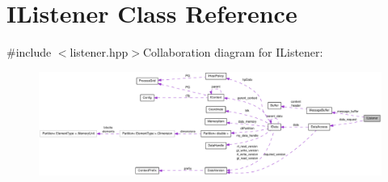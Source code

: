 \hypertarget{class_i_listener}{
\section{IListener Class Reference}
\label{class_i_listener}
}


{\ttfamily \#include $<$listener.hpp$>$}Collaboration diagram for IListener:\nopagebreak
\begin{figure}[H]
\begin{center}
\leavevmode
\includegraphics[width=400pt]{class_i_listener__coll__graph}
\end{center}
\end{figure}
